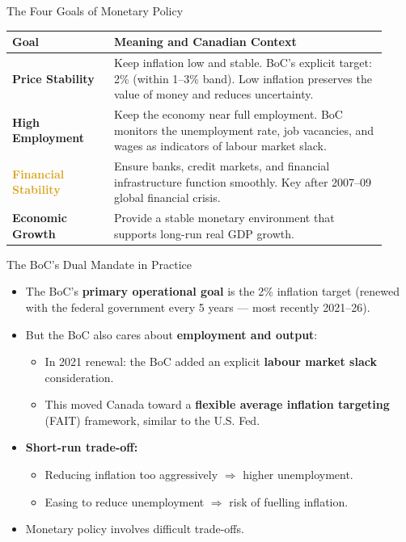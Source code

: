 \documentclass[aspectratio=169]{beamer}
\begin{document}
\begin{frame}{The Four Goals of Monetary Policy}
\transfade
\begin{center}
\begin{tabular}{p{0.25\linewidth} p{0.67\linewidth}}
\toprule
\textbf{Goal} & \textbf{Meaning and Canadian Context} \\
\midrule
\textcolor{accent}{\textbf{Price Stability}} & Keep inflation low and stable. BoC's explicit target: \alert{2\%} (within 1--3\% band). Low inflation preserves the value of money and reduces uncertainty. \\
\addlinespace
\textcolor{leafgreen}{\textbf{High Employment}} & Keep the economy near full employment. BoC monitors the unemployment rate, job vacancies, and wages as indicators of labour market slack. \\
\addlinespace
\textcolor{goldenrod}{\textbf{Financial Stability}} & Ensure banks, credit markets, and financial infrastructure function smoothly. Key after 2007--09 global financial crisis. \\
\addlinespace
\textcolor{deeporange}{\textbf{Economic Growth}} & Provide a stable monetary environment that supports long-run real GDP growth. \\
\bottomrule
\end{tabular}
\end{center}
\end{frame}

\begin{frame}{The BoC's Dual Mandate in Practice}
\transfade
\begin{itemize}[<+->]
  \item The BoC's \textbf{primary operational goal} is the 2\% inflation target (renewed with the federal government every 5 years --- most recently 2021--26).
  \item But the BoC also cares about \textbf{employment and output}:
  \begin{itemize}[<+->]
    \item In 2021 renewal: the BoC added an explicit \textbf{labour market slack} consideration.
    \item This moved Canada toward a \textbf{flexible average inflation targeting} (FAIT) framework, similar to the U.S. Fed.
  \end{itemize}
  \item \textbf{Short-run trade-off:}
  \begin{itemize}[<+->]
    \item Reducing inflation too aggressively $\Rightarrow$ higher unemployment.
    \item Easing to reduce unemployment $\Rightarrow$ risk of fuelling inflation.
  \end{itemize}
  \item Monetary policy involves \alert{difficult trade-offs}.
\end{itemize}
\end{frame}
\end{document}
